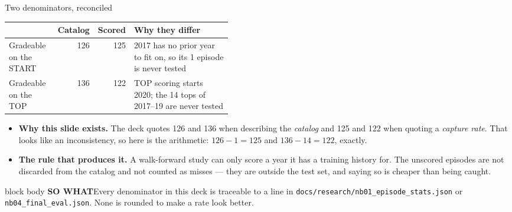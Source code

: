 \documentclass[aspectratio=169,11pt]{beamer}
\newcommand{\pb}{\discretionary{}{}{}}
\newcommand{\sowhatfont}{\footnotesize}
\newcommand{\sowhat}[1]{%
  \vspace{0.3em}
  \begin{beamercolorbox}[wd=\linewidth,sep=0.55em]{block body}
    {\sowhatfont\textbf{\color{gicnavy}SO WHAT}\quad #1}
  \end{beamercolorbox}}
\begin{document}
\begin{frame}{Two denominators, reconciled}
  \footnotesize
  \begin{table}
    \begin{tabular}{@{}lrrp{0.44\linewidth}@{}}
      \toprule
      & \textbf{Catalog} & \textbf{Scored} & \textbf{Why they differ} \\
      \midrule
      Gradeable on the START & 126 & 125
        & 2017 has no prior year to fit on, so its 1 episode is never tested \\
      Gradeable on the TOP   & 136 & 122
        & TOP scoring starts 2020; the 14 tops of 2017--19 are never tested \\
      \bottomrule
    \end{tabular}
  \end{table}
  \vspace{0.6em}
  \begin{itemize}
    \item \textbf{Why this slide exists.} The deck quotes 126 and 136 when
      describing the \emph{catalog} and 125 and 122 when quoting a
      \emph{capture rate}. That looks like an inconsistency, so here is the
      arithmetic: $126-1=125$ and $136-14=122$, exactly.
    \item \textbf{The rule that produces it.} A walk-forward study can only
      score a year it has a training history for. The unscored episodes are
      not discarded from the catalog and not counted as misses --- they are
      outside the test set, and saying so is cheaper than being caught.
  \end{itemize}
  \sowhat{Every denominator in this deck is traceable to a line in
    \texttt{docs/\pb research/\pb nb01\_\pb episode\_\pb stats.json} or
    \texttt{nb04\_final\_eval.json}. None is rounded to make a rate look
    better.}
\end{frame}

\end{document}
